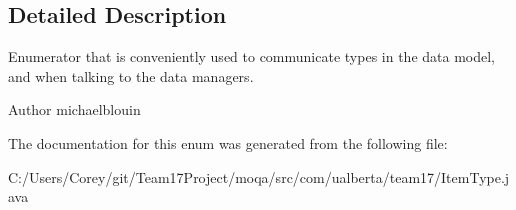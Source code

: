 \subsection{Detailed Description}
Enumerator that is conveniently used to communicate types in the data model, and when talking to the data managers.

\begin{DoxyAuthor}{Author}
michaelblouin 
\end{DoxyAuthor}


The documentation for this enum was generated from the following file\+:\begin{DoxyCompactItemize}
\item 
C\+:/\+Users/\+Corey/git/\+Team17\+Project/moqa/src/com/ualberta/team17/Item\+Type.\+java\end{DoxyCompactItemize}
